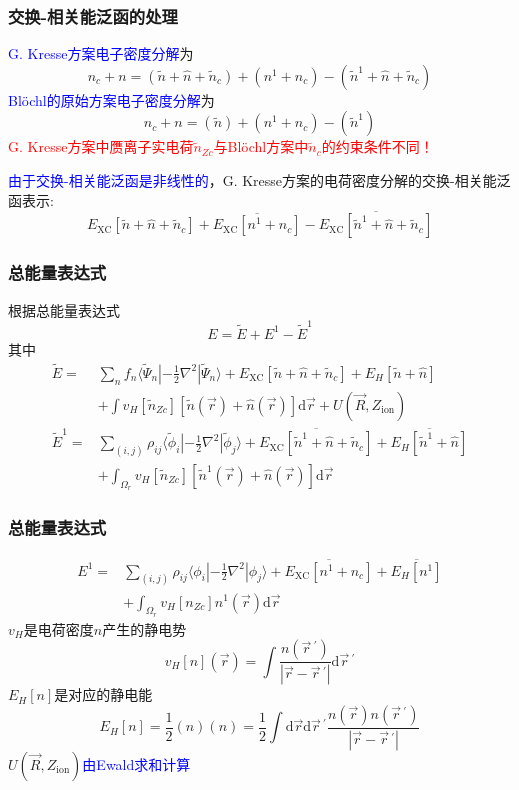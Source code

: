 \documentclass[cjk,slidestop,compress,mathserif,blue]{beamer}
\begin{document}
\frame
{
\frametitle{交换-相关能泛函的处理}
\textcolor{blue}{\textrm{G. Kresse}方案电子密度分解}为
\begin{displaymath}
	n_c+n=(\tilde n+\hat n+\tilde n_c)+(n^1+n_c)-(\tilde n^1+\hat n+\tilde n_c)
\end{displaymath}
\textcolor{blue}{\textrm{Bl\"ochl}的原始方案电子密度分解}为
\begin{displaymath}
	n_c+n=(\tilde n)+(n^1+n_c)-(\tilde n^1)
\end{displaymath}
\textcolor{red}{\textrm{G. Kresse}方案中赝离子实电荷$\tilde n_{Zc}$与\textrm{Bl\"ochl}方案中$\tilde n_c$的约束条件不同！}

\textcolor{blue}{由于交换-相关能泛函是非线性的}，\textrm{G. Kresse}方案的电荷密度分解的交换-相关能泛函表示:
\begin{displaymath}
	E_{\mathrm{XC}}[\tilde n+\hat n+\tilde n_c]+\overline{E_{\mathrm{XC}}[n^1+n_c]}-\overline{E_{\mathrm{XC}}[\tilde n^1+\hat n+\tilde n_c]}
\end{displaymath}
}

\frame
{
	\frametitle{总能量表达式}
	根据总能量表达式$$E=\tilde E+E^1-\tilde E^1$$其中
	\begin{displaymath}
		\begin{aligned}
			\tilde E=&\sum_nf_n\langle\tilde\Psi_n|-\frac12\nabla^2|\tilde\Psi_n\rangle+E_{\mathrm{XC}}[\tilde n+\hat n+\tilde n_c]+E_H[\tilde n+\hat n]\\
			&+\int v_H[\tilde n_{Zc}][\tilde n(\vec r)+\hat n(\vec r)]\mathrm{d}\vec r+U(\vec R,Z_{\mathrm{ion}})\\
			\tilde E^1=&\sum_{(i,j)}\rho_{ij}\langle\tilde\phi_i|-\frac12\nabla^2|\tilde\phi_j\rangle+\overline{E_{\mathrm{XC}}[\tilde n^1+\hat n+\tilde n_c]}+\overline{E_H[\tilde n^1+\hat n]}\\
			&+\int_{\Omega_r}v_H[\tilde n_{Zc}][\tilde n^1(\vec r)+\hat n(\vec r)]\mathrm{d}\vec r
		\end{aligned}
	\end{displaymath}
}

\frame
{
	\frametitle{总能量表达式}
	\begin{displaymath}
		\begin{aligned}
			E^1=&\sum_{(i,j)}\rho_{ij}\langle\phi_i|-\frac12\nabla^2|\phi_j\rangle+\overline{E_{\mathrm{XC}}[n^1+n_c]}+\overline{E_H[n^1]}\\
			&+\int_{\Omega_r}v_H[n_{Zc}]n^1(\vec r)\mathrm{d}\vec r
		\end{aligned}
	\end{displaymath}
	$v_H$是电荷密度$n$产生的静电势
	$$v_H[n](\vec r)=\int\dfrac{n(\vec r\,^{\prime})}{|\vec r-\vec r\,^{\prime}|}\mathrm{d}\vec r\,^{\prime}$$
	$E_H[n]$是对应的静电能
	$$E_H[n]=\dfrac12(n)(n)=\dfrac12\int\mathrm{d}\vec r\mathrm{d}\vec r\,^{\prime}\dfrac{n(\vec r)n(\vec r\,^{\prime})}{|\vec r-\vec r\,^{\prime}|}$$ 
	$U(\vec R,Z_{\mathrm{ion}})$\textcolor{blue}{由\textrm{Ewald}求和计算}
}
\end{document}
